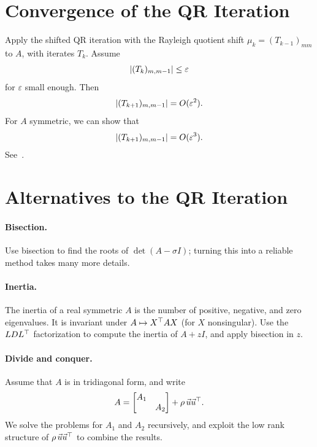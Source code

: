 \section{Convergence of the QR Iteration}
\label{sec:qr-convergence}

\begin{theorem}
  \label{thm:qr-local-conv}
  Apply the shifted QR iteration with the Rayleigh quotient shift $\mu_k = (T_{k-1})_{mm}$ to $A$, with iterates $T_k$. Assume
  \begin{equation}
    \left\lvert (T_k)_{m,m-1} \right\rvert \le \varepsilon
  \end{equation}
  for $\varepsilon$ small enough. Then
  \begin{equation}
    \left\lvert (T_{k+1})_{m,m-1} \right\rvert = O(\varepsilon^2).
  \end{equation}
  For $A$ symmetric, we can show that
  \begin{equation}
    \left\lvert (T_{k+1})_{m,m-1} \right\rvert = O(\varepsilon^3).
  \end{equation}
  See~\cite[Sections 4.4.4 and 5.3.2]{Demmel}.
\end{theorem}

\section{Alternatives to the QR Iteration}
\label{sec:qr-alternatives}

\paragraph{Bisection.} Use bisection to find the roots of $\det(A - \sigma I)$; turning this into a reliable method takes many more details.

\paragraph{Inertia.} The inertia of a real symmetric $A$ is the number of positive, negative, and zero eigenvalues. It is invariant under $A \mapsto X^\top AX$ (for $X$ nonsingular). Use the $LDL^\top$ factorization to compute the inertia of $A + zI$, and apply bisection in $z$.

\paragraph{Divide and conquer.} Assume that $A$ is in tridiagonal form, and write
\begin{equation}
  A = \begin{bmatrix} A_1 & \\ & A_2 \end{bmatrix} + \rho\,\vec{u}\vec{u}^\top.
\end{equation}
We solve the problems for $A_1$ and $A_2$ recursively, and exploit the low rank structure of $\rho\,\vec{u}\vec{u}^\top$ to combine the results.

